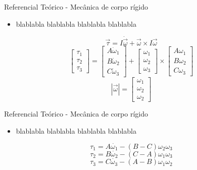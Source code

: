 \documentclass{beamer}
\begin{document}

\begin{frame}{Referencial Teórico - Mecânica de corpo rígido}
	\begin{itemize}
		\justifying
		\item blablabla blablabla blablabla blablabla
    \end{itemize}

    \begin{equation}\label{eq:torque}
		\vec{\tau}=I\dot{\vec{\omega}}+\vec{\omega}\times I \vec{\omega}
	\end{equation}
    \begin{equation}
		\begin{bmatrix}\tau_{1}\\\tau_{2}\\\tau_{3}\end{bmatrix}=\begin{bmatrix}A\dot{\omega}_{1}\\B\dot{\omega}_{2}\\C\dot{\omega}_{3}\end{bmatrix}+\begin{bmatrix}\omega_{1}\\\omega_{2}\\\omega_{3}\end{bmatrix}\times\begin{bmatrix}A\omega_{1}\\B\omega_{2}\\C\omega_{3}\end{bmatrix}
	\end{equation}
	\begin{equation}
		\left|\vec{\omega}\right|=\begin{bmatrix}\omega_1\\\omega_2\\\omega_2\end{bmatrix}
	\end{equation}

\end{frame}


\begin{frame}{Referencial Teórico - Mecânica de corpo rígido}
	\begin{itemize}
		\justifying
		\item blablabla blablabla blablabla blablabla 
    \end{itemize}

    \begin{equation}
	  \tau_1=A\dot{\omega_1}-(B-C)\omega_2\omega_3 
	\end{equation}
    \begin{equation}
	  \tau_2=B\dot{\omega_2}-(C-A)\omega_1\omega_3 
	\end{equation}
	\begin{equation}
	  \tau_3=C\dot{\omega_3}-(A-B)\omega_1\omega_2
	\end{equation}
\end{frame}
\end{document}
